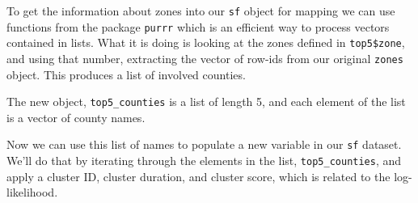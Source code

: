\documentclass[
]{book}
\newenvironment{Shaded}{\begin{snugshade}}{\end{snugshade}}
\newcommand{\AttributeTok}[1]{\textcolor[rgb]{0.77,0.63,0.00}{#1}}
\newcommand{\CommentTok}[1]{\textcolor[rgb]{0.56,0.35,0.01}{\textit{#1}}}
\newcommand{\ControlFlowTok}[1]{\textcolor[rgb]{0.13,0.29,0.53}{\textbf{#1}}}
\newcommand{\DecValTok}[1]{\textcolor[rgb]{0.00,0.00,0.81}{#1}}
\newcommand{\DocumentationTok}[1]{\textcolor[rgb]{0.56,0.35,0.01}{\textbf{\textit{#1}}}}
\newcommand{\FunctionTok}[1]{\textcolor[rgb]{0.00,0.00,0.00}{#1}}
\newcommand{\NormalTok}[1]{#1}
\newcommand{\OtherTok}[1]{\textcolor[rgb]{0.56,0.35,0.01}{#1}}
\newcommand{\SpecialCharTok}[1]{\textcolor[rgb]{0.00,0.00,0.00}{#1}}
\begin{document}
To get the information about zones into our \texttt{sf} object for mapping we can use functions from the package \texttt{purrr} which is an efficient way to process vectors contained in lists. What it is doing is looking at the zones defined in \texttt{top5\$zone}, and using that number, extracting the vector of row-ids from our original \texttt{zones} object. This produces a list of involved counties.

\begin{Shaded}
\end{Shaded}

The new object, \texttt{top5\_counties} is a list of length 5, and each element of the list is a vector of county names.

Now we can use this list of names to populate a new variable in our \texttt{sf} dataset. We'll do that by iterating through the elements in the list, \texttt{top5\_counties}, and apply a cluster ID, cluster duration, and cluster score, which is related to the log-likelihood.

\begin{Shaded}
\end{Shaded}
\end{document}

